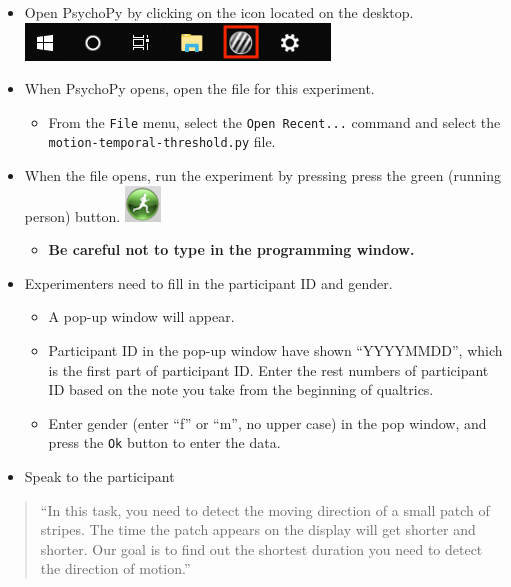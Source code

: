\documentclass[]{article}
\providecommand{\tightlist}{%
  \setlength{\itemsep}{0pt}\setlength{\parskip}{0pt}}
\begin{document}
\begin{itemize}
\tightlist
\item
  Open PsychoPy by clicking on the icon located on the desktop.
  \includegraphics{images/PsychoPy-1.PNG}\\
\item
  When PsychoPy opens, open the file for this experiment.

  \begin{itemize}
  \tightlist
  \item
    From the \texttt{File} menu, select the \texttt{Open\ Recent...}
    command and select the \texttt{motion-temporal-threshold.py} file.
  \end{itemize}
\item
  When the file opens, run the experiment by pressing press the green
  (running person) button. \includegraphics{images/PPrunningMan.png}

  \begin{itemize}
  \tightlist
  \item
    \textbf{Be careful not to type in the programming window.}
  \end{itemize}
\item
  Experimenters need to fill in the participant ID and gender.

  \begin{itemize}
  \tightlist
  \item
    A pop-up window will appear.
  \item
    Participant ID in the pop-up window have shown ``YYYYMMDD'', which
    is the first part of participant ID. Enter the rest numbers of
    participant ID based on the note you take from the beginning of
    qualtrics.
  \item
    Enter gender (enter ``f'' or ``m'', no upper case) in the pop
    window, and press the \texttt{Ok} button to enter the data.
  \end{itemize}
\item
  Speak to the participant
\end{itemize}

\begin{quote}
``In this task, you need to detect the moving direction of a small patch
of stripes. The time the patch appears on the display will get shorter
and shorter. Our goal is to find out the shortest duration you need to
detect the direction of motion.''
\end{quote}
\end{document}
